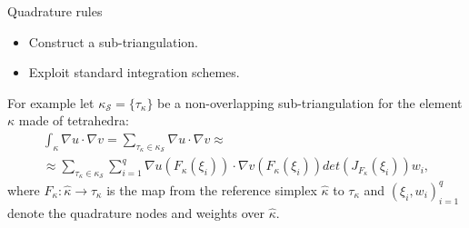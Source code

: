 \documentclass{beamer}
\begin{document}
\begin{frame}{Quadrature rules}
	\begin{itemize}
		\item Construct a sub-triangulation.
		\item Exploit standard integration schemes.
	\end{itemize}
	For example let	$\kappa_\mathcal{S} = \{\tau_\kappa\}$ be a non-overlapping
	sub-triangulation for the element $\kappa$ made of tetrahedra:
	\begin{multline*}
	\int_\kappa \nabla u \cdot \nabla v = \sum_{\tau_\kappa \in
	\kappa_\mathcal{S}} \nabla u \cdot \nabla v \approx\\
	\approx \sum_{\tau_\kappa \in
	\kappa_\mathcal{S}} \sum_{i=1}^{q} \nabla u(F_\kappa(\xi_i)) \cdot \nabla
	v(F_\kappa(\xi_i)) det(J_{F_\kappa}(\xi_i))w_i,
	\end{multline*}
	where $F_\kappa: \hat{\kappa} \rightarrow \tau_\kappa$ is the map from the
	reference simplex $\hat{\kappa}$ to $\tau_\kappa$ and $(\xi_i,
	w_i)^q_{i=1}$ denote the quadrature nodes and weights
	over $\hat{\kappa}$.
\end{frame}
\end{document}
